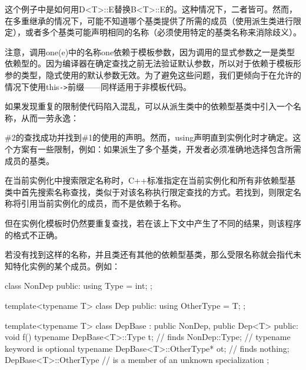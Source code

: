这个例子中是如何用D<T>::E替换B<T>::E的。这种情况下，二者皆可。然而，在多重继承的情况下，可能不知道哪个基类提供了所需的成员（使用派生类进行限定），或者多个基类可能声明相同的名称（必须使用特定的基类名称来消除歧义）。

注意，调用one(e)中的名称one依赖于模板参数，因为调用的显式参数之一是类型依赖型的。因为编译器在确定查找之前无法验证默认参数，所以对于依赖于模板形参的类型，隐式使用的默认参数无效。为了避免这些问题，我们更倾向于在允许的情况下使用this\texttt{->}前缀——同样适用于非模板代码。

如果发现重复的限制使代码陷入混乱，可以从派生类中的依赖型基类中引入一个名称，从而一劳永逸：


\#2的查找成功并找到\#1的使用的声明。然而，using声明直到实例化时才确定。这个方案有一些限制，例如：如果派生了多个基类，开发者必须准确地选择包含所需成员的基类。

在当前实例化中搜索限定名称时，C++标准指定在当前实例化和所有非依赖型基类中首先搜索名称查找，类似于对该名称执行限定查找的方式。若找到，则限定名称将引用当前实例化的成员，而不是依赖于名称。

\begin{notice}
但在实例化模板时仍然要重复查找，若在该上下文中产生了不同的结果，则该程序的格式不正确。
\end{notice}

若没有找到这样的名称，并且类还有其他的依赖型基类，那么受限名称就会指代未知特化实例的某个成员。例如：

\begin{cpp}
class NonDep {
	public:
	using Type = int;
};

template<typename T>
class Dep {
	public:
	using OtherType = T;
};

template<typename T>
class DepBase : public NonDep, public Dep<T> {
	public:
	void f() {
		typename DepBase<T>::Type t; // finds NonDep::Type;
		// typename keyword is optional
		typename DepBase<T>::OtherType* ot; // finds nothing; DepBase<T>::OtherType
		// is a member of an unknown specialization
	}
};
\end{cpp}























